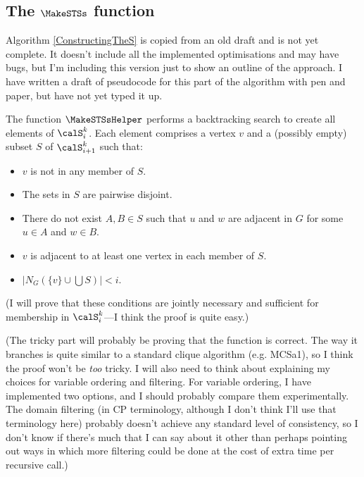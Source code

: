 \FloatBarrier

\subsection{The $\MakeSTSs$ function}

Algorithm \ref{ConstructingTheS} is copied from an old draft and is not yet complete.
It doesn't include all the implemented optimisations and may have bugs, but I'm including
this version just to show an outline of the approach.
I have written a draft of pseudocode for this part of the algorithm with pen and paper,
but have not yet typed it up.

The function $\MakeSTSsHelper$ performs a backtracking search to create all elements of
$\calS_i^k$.  Each element comprises a vertex $v$ and a (possibly empty) subset $S$ of $\calS_{i+1}^k$
such that:

\begin{itemize}
  \item $v$ is not in any member of $S$.
  \item The sets in $S$ are pairwise disjoint.
  \item There do not exist $A, B \in S$ such that $u$ and $w$ are adjacent in $G$ for some
        $u \in A$ and $w \in B$.
  \item $v$ is adjacent to at least one vertex in each member of $S$.
  \item $|N_G(\{v\} \cup \bigcup S)| < i$.
\end{itemize}

(I will prove that these conditions are jointly necessary and sufficient for membership in $\calS_i^k$---I
think the proof is quite easy.)

(The tricky part will probably be proving that the function is correct.  The way it branches is
quite similar to a standard clique algorithm (e.g. MCSa1), so I think the proof won't be \emph{too}
tricky. I will also need to think about explaining my choices for variable ordering and filtering.
For variable ordering, I have implemented two options, and I should probably compare them experimentally. The domain
filtering (in CP terminology, although I don't think I'll use that terminology here) probably doesn't
achieve any standard level of consistency, so I don't know if there's much that I can say about it
other than perhaps pointing out ways in which more filtering could be done at the cost of extra
time per recursive call.)

